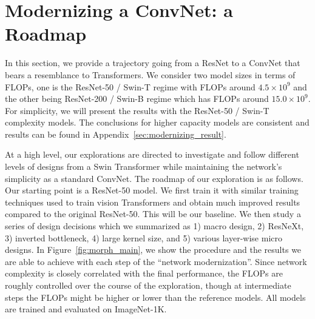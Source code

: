 \documentclass[10pt,twocolumn,letterpaper]{article}
\begin{document}
\section{Modernizing a ConvNet: a Roadmap}
\label{sec:modernizing}
In this section, we provide a trajectory going from a ResNet to a ConvNet that bears a resemblance to Transformers. We consider two model sizes in terms of FLOPs, one is the ResNet-50 / Swin-T regime with FLOPs around $4.5\times 10^9$ and the other being ResNet-200 / Swin-B regime which has FLOPs around $15.0\times 10^9$. For simplicity, we will present the results with the ResNet-50 / Swin-T complexity models. The conclusions for higher capacity models are consistent and results can be found in Appendix~\ref{sec:modernizing_result}.

At a high level, our explorations are directed to investigate and follow different levels of designs from a Swin Transformer while maintaining the network's simplicity as a standard ConvNet. The roadmap of our exploration is as follows. Our starting point is a ResNet-50 model. We first train it with similar training techniques used to train vision Transformers and obtain much improved results compared to the original ResNet-50. This will be our baseline. We then study a series of design decisions which we summarized as 1) macro design, 2) ResNeXt, 3) inverted bottleneck, 4) large kernel size, and 5) various layer-wise micro designs. In Figure~\ref{fig:morph_main}, we show the procedure and the results we are able to achieve with each step of the ``network modernization''. Since network complexity is closely correlated with the final performance, the FLOPs are roughly controlled over the course of the exploration, though at intermediate steps the FLOPs might be higher or lower than the reference models. All models are trained and evaluated on ImageNet-1K.
\end{document}
